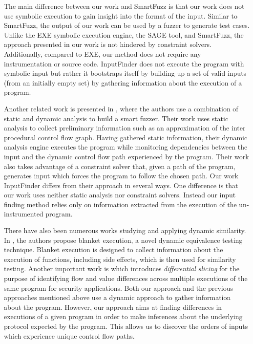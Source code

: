 \documentclass{acm_proc_article-sp}
\def \tool {InputFinder}
\begin{document}
The main difference between our work and SmartFuzz is that our work does not use symbolic execution to gain insight into the format of the input.
Similar to SmartFuzz, the output of our work can be used by a fuzzer to generate test cases.
Unlike the EXE symbolic execution engine, the SAGE tool, and SmartFuzz, the approach presented in our work is not hindered by constraint solvers.
Additionally, compared to EXE, our method does not require any instrumentation or source code.
\tool{} does not execute the program with symbolic input but rather it bootstraps itself by building up a set of valid inputs (from an initially empty set) by gathering information about the execution of a program.

Another related work is presented in \cite{smartfuzzer}, where the authors use a combination of static and dynamic analysis to build a smart fuzzer.
Their work uses static analysis to collect preliminary information such as an approximation of the inter procedural control flow graph.
Having gathered static information, their dynamic analysis engine executes the program while monitoring dependencies between the input and the dynamic control flow path experienced by the program.
Their work also takes advantage of a constraint solver that, given a path of the program, generates input which forces the program to follow the chosen path.
Our work \tool{} differs from their approach in several ways.
One difference is that our work uses neither static analysis nor constraint solvers.
Instead our input finding method relies only on information extracted from the execution of the un-instrumented program. 

There have also been numerous works studying and applying dynamic similarity.
In \cite{blanketexec}, the authors propose blanket execution, a novel dynamic equivalence testing technique.
Blanket execution is designed to collect information about the execution of functions, including side effects, which is then used for similarity testing.
Another important work is \cite{differential} which introduces \textit{differential slicing} for the purpose of identifying flow and value differences across multiple executions of the same program for security applications.
Both our approach and the previous approaches mentioned above use a dynamic approach to gather information about the program.
However, our approach aims at finding differences in executions of a given program in order to make inferences about the underlying protocol expected by the program.
This allows us to discover the orders of inputs which experience unique control flow paths.
\end{document}
